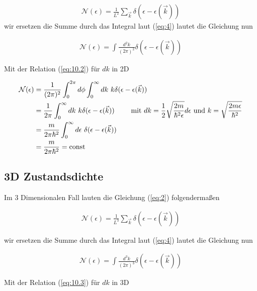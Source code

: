 \begin{align}
  \label{eq:11}
  \mathcal N(\epsilon) = \frac{1}{L^2} \sum_{\vec k} \delta(\epsilon - \epsilon(\vec k))
\end{align}
wir ersetzen die Summe durch das Integral laut (\ref{eq:4}) lautet die Gleichung nun

\begin{align}
  \label{eq:12}
  \mathcal N(\epsilon) =  \int \frac{d^2 k}{(2\pi)^2}  \delta(\epsilon - \epsilon(\vec k))
\end{align}

Mit der Relation (\ref{eq:10.2}) für \(dk\) in 2D

\begin{align}
  \label{eq:13}
  \mathcal N(\epsilon) &=\frac{1}{(2\pi)^2} \int_0^{2\pi}d\phi \int_0^{\infty} dk \,\, k   \delta(\epsilon - \epsilon(\vec k))  \notag\\
   &=\frac{1}{2\pi} \int_0^{\infty} dk \,\, k   \delta(\epsilon - \epsilon(\vec k)) \qquad \text{ mit }dk = \frac{1}{2} \sqrt{\frac{2m}{\hbar^2  \epsilon}} d\epsilon \text{ und }  k = \sqrt{\frac{2m \epsilon}{\hbar^2}} \notag\\
   &=\frac{m}{2\pi\hbar^2 } \int_0^{\infty} d\epsilon \,\,  \delta(\epsilon - \epsilon(\vec k)) \notag\\
 &=\frac{m}{2\pi\hbar^2 } = \text{const}
\end{align}

\subsection*{3D Zustandsdichte}

Im 3 Dimensionalen Fall lauten die Gleichung (\ref{eq:2}) folgendermaßen

\begin{align}
  \label{eq:14}
  \mathcal N(\epsilon) = \frac{1}{L^3} \sum_{\vec k} \delta(\epsilon - \epsilon(\vec k))
\end{align}

wir ersetzen die Summe durch das Integral laut (\ref{eq:4}) lautet die Gleichung nun

\begin{align}
  \label{eq:15}
  \mathcal N(\epsilon) =  \int \frac{d^3 k}{(2\pi)^3}  \delta(\epsilon - \epsilon(\vec k))
\end{align}

Mit der Relation (\ref{eq:10.3}) für \(dk\) in 3D

